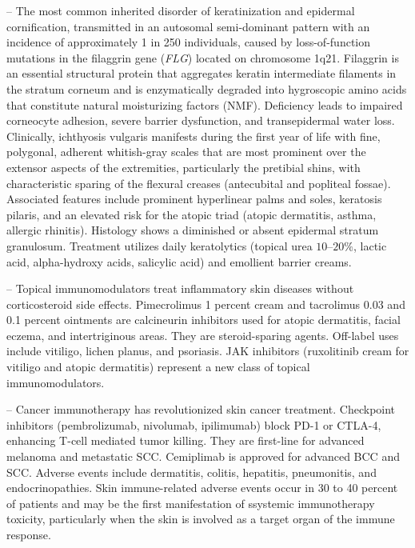 -- The most common inherited disorder of keratinization and epidermal cornification, transmitted in an autosomal semi-dominant pattern with an incidence of approximately 1 in 250 individuals, caused by loss-of-function mutations in the filaggrin gene (\textit{FLG}) located on chromosome 1q21. Filaggrin is an essential structural protein that aggregates keratin intermediate filaments in the stratum corneum and is enzymatically degraded into hygroscopic amino acids that constitute natural moisturizing factors (NMF). Deficiency leads to impaired corneocyte adhesion, severe barrier dysfunction, and transepidermal water loss. Clinically, ichthyosis vulgaris manifests during the first year of life with fine, polygonal, adherent whitish-gray scales that are most prominent over the extensor aspects of the extremities, particularly the pretibial shins, with characteristic sparing of the flexural creases (antecubital and popliteal fossae). Associated features include prominent hyperlinear palms and soles, keratosis pilaris, and an elevated risk for the atopic triad (atopic dermatitis, asthma, allergic rhinitis). Histology shows a diminished or absent epidermal stratum granulosum. Treatment utilizes daily keratolytics (topical urea $10\text{--}20\%$, lactic acid, alpha-hydroxy acids, salicylic acid) and emollient barrier creams.

-- Topical immunomodulators treat inflammatory skin diseases without corticosteroid side effects. Pimecrolimus 1 percent cream and tacrolimus 0.03 and 0.1 percent ointments are calcineurin inhibitors used for atopic dermatitis, facial eczema, and intertriginous areas. They are steroid-sparing agents. Off-label uses include vitiligo, lichen planus, and psoriasis. JAK inhibitors (ruxolitinib cream for vitiligo and atopic dermatitis) represent a new class of topical immunomodulators.

-- Cancer immunotherapy has revolutionized skin cancer treatment. Checkpoint inhibitors (pembrolizumab, nivolumab, ipilimumab) block PD-1 or CTLA-4, enhancing T-cell mediated tumor killing. They are first-line for advanced melanoma and metastatic SCC. Cemiplimab is approved for advanced BCC and SCC. Adverse events include dermatitis, colitis, hepatitis, pneumonitis, and endocrinopathies. Skin immune-related adverse events occur in 30 to 40 percent of patients and may be the first manifestation of ssystemic immunotherapy toxicity, particularly when the skin is involved as a target organ of the immune response.

